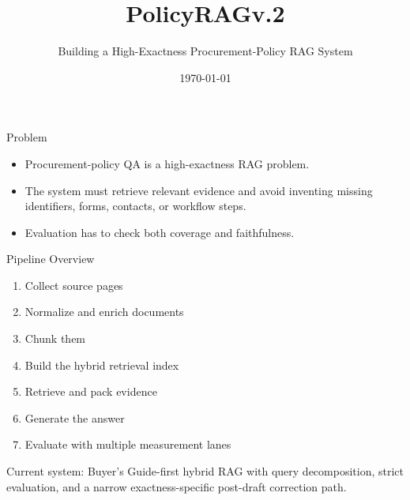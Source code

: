 \documentclass[aspectratio=169]{beamer}
\title{PolicyRAGv.2}
\subtitle{Building a High-Exactness Procurement-Policy RAG System}
\author{}
\date{\today}
\begin{document}
\begin{frame}
  \titlepage
\end{frame}

\begin{frame}{Problem}
  \begin{itemize}
    \item Procurement-policy QA is a high-exactness RAG problem.
    \item The system must retrieve relevant evidence and avoid inventing missing identifiers, forms, contacts, or workflow steps.
    \item Evaluation has to check both coverage and faithfulness.
  \end{itemize}
\end{frame}

\begin{frame}{Pipeline Overview}
  \begin{enumerate}
    \item Collect source pages
    \item Normalize and enrich documents
    \item Chunk them
    \item Build the hybrid retrieval index
    \item Retrieve and pack evidence
    \item Generate the answer
    \item Evaluate with multiple measurement lanes
  \end{enumerate}
  \vspace{0.5em}
  Current system: Buyer’s Guide-first hybrid RAG with query decomposition, strict
  evaluation, and a narrow exactness-specific post-draft correction path.
\end{frame}
\end{document}
